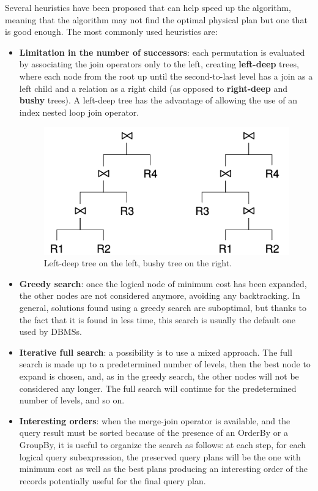 Several heuristics have been proposed that can help speed up the algorithm, meaning that the algorithm may not find the optimal physical plan but one that is good enough. The most commonly used heuristics are:
\begin{itemize}
    \item \textbf{Limitation in the number of successors}: each permutation is evaluated by associating the join operators only to the left, creating \textbf{left-deep} trees, where each node from the root up until the second-to-last level has a join as a left child and a relation as a right child (as opposed to \textbf{right-deep} and \textbf{bushy} trees). A left-deep tree has the advantage of allowing the use of an index nested loop join operator. 

    \begin{figure}[h]
        \centering
        \includegraphics[width=0.5\linewidth]{img/leftdeep_vs_bushy.png}
        \caption{Left-deep tree on the left, bushy tree on the right.}
        \label{fig:ldeep-vs-bushy}
    \end{figure}

    \item \textbf{Greedy search}: once the logical node of minimum cost has been expanded, the other nodes are not considered anymore, avoiding any backtracking. In general, solutions found using a greedy search are suboptimal, but thanks to the fact that it is found in less time, this search is usually the default one used by DBMSs.

    \item \textbf{Iterative full search}: a possibility is to use a mixed approach. The full search is made up to a predetermined number of levels, then the best node to expand is chosen, and, as in the greedy search, the other nodes will not be considered any longer. The full search will continue for the predetermined number of levels, and so on.

    \item \textbf{Interesting orders}: when the merge-join operator is available, and the query result must be sorted because of the presence of an OrderBy or a GroupBy, it is useful to organize the search as follows: at each step, for each logical query subexpression, the preserved query plans will be the one with minimum cost as well as the best plans producing an interesting order of the records potentially useful for the final query plan. 
\end{itemize}

